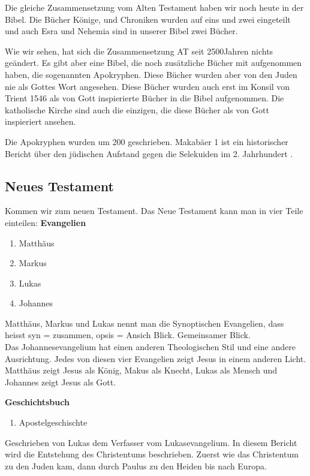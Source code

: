 Die gleiche Zusammensetzung vom Alten Testament haben wir noch heute in der Bibel. Die Bücher Könige, und Chroniken wurden auf eins und zwei eingeteilt und auch Esra und Nehemia sind in unserer Bibel zwei Bücher. 

Wie wir sehen, hat sich die Zusammensetzung AT seit 2500Jahren nichts geändert. Es gibt aber eine Bibel, die noch zusätzliche Bücher mit aufgenommen haben, die sogenannten Apokryphen. Diese Bücher wurden aber von den Juden nie als Gottes Wort angesehen. Diese Bücher wurden auch erst im Konsil von Trient 1546 als von Gott inspierierte Bücher in die Bibel aufgenommen. Die katholische Kirche sind auch die einzigen, die diese Bücher als von Gott inspieriert ansehen.

Die Apokryphen wurden um 200 \vChr{} geschrieben. Makabäer 1 ist ein historischer Bericht über den jüdischen Aufstand gegen die Selekuiden im 2. Jahrhundert \vChr{}.

\subsection{Neues Testament}
Kommen wir zum neuen Testament. Das Neue Testament kann man in vier Teile einteilen:
\textbf{Evangelien}
\begin{enumerate}
  \item Matthäus
  \item Markus
  \item Lukas
  \item Johannes
\end{enumerate}
Matthäus, Markus und Lukas nennt man die Synoptischen Evangelien, dass heisst syn = zusammen, opsis = Ansich Blick. Gemeinsamer Blick.\\
Das Johannesevangelium hat einen anderen Theologischen Stil und eine andere Ausrichtung. Jedes von diesen vier Evangelien zeigt Jesus in einem anderen Licht. Matthäus zeigt Jesus als König, Makus als Knecht, Lukas als Mensch und Johannes zeigt Jesus als Gott.

\textbf{Geschichtsbuch}
\begin{enumerate}
  \item Apostelgeschischte
\end{enumerate}
Geschrieben von Lukas dem Verfasser vom Lukasevangelium. In diesem Bericht wird die Entstehung des Christentums beschrieben. Zuerst wie das Christentum zu den Juden kam, dann durch Paulus zu den Heiden bis nach Europa.


